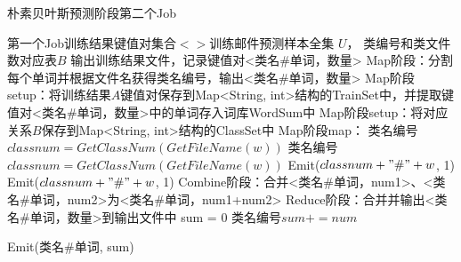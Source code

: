\documentclass[lang=cn,11pt]{elegantpaper}
\begin{document}
\begin{algorithm}[htb]
  \caption{朴素贝叶斯预测阶段第二个Job}
  \label{alg:Framwork}
  \begin{algorithmic}[1]
    \Require
    第一个Job训练结果键值对集合$<>$训练邮件预测样本全集 $U$， 类编号和类文件数对应表$B$
    \Ensure
    输出训练结果文件，记录键值对<类名\#单词，数量>
    \State Map阶段：分割每个单词并根据文件名获得类名编号，输出<类名\#单词，数量>
	\State Map阶段setup：将训练结果$A$键值对保存到Map<String, int>结构的TrainSet中，并提取键值对<类名\#单词，数量>中的单词存入词库WordSum中
	\State Map阶段setup：将对应关系$B$保存到Map<String, int>结构的ClassSet中
	\State Map阶段map：
      \State 类名编号$classnum = GetClassNum(GetFileName(w))$
      		\State 类名编号$classnum = GetClassNum(GetFileName(w))$
      		\State Emit($classnum + "\#" + w$, 1)
   			\EndFor
      \State Emit($classnum + "\#" + w$, 1)
   \EndFor
	\State Combine阶段：合并<类名\#单词，num1>、<类名\#单词，num2>为<类名\#单词，num1+num2>
    \State Reduce阶段：合并并输出<类名\#单词，数量>到输出文件中
    \State sum = 0
      \State 类名编号$sum += num$

   \EndFor
	\State Emit(类名\#单词, sum)
  \end{algorithmic}
\end{algorithm}
\end{document}
